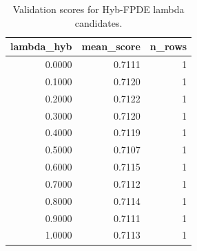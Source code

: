 \begin{table}[t]
\caption{Validation scores for Hyb-FPDE lambda candidates.}
\label{tab:lambda_distribution_computed}
\centering
\begin{tabular}{rrr}
\toprule
lambda\_hyb & mean\_score & n\_rows \\
\midrule
0.0000 & 0.7111 & 1 \\
0.1000 & 0.7120 & 1 \\
0.2000 & 0.7122 & 1 \\
0.3000 & 0.7120 & 1 \\
0.4000 & 0.7119 & 1 \\
0.5000 & 0.7107 & 1 \\
0.6000 & 0.7115 & 1 \\
0.7000 & 0.7112 & 1 \\
0.8000 & 0.7114 & 1 \\
0.9000 & 0.7111 & 1 \\
1.0000 & 0.7113 & 1 \\
\bottomrule
\end{tabular}

\end{table}
